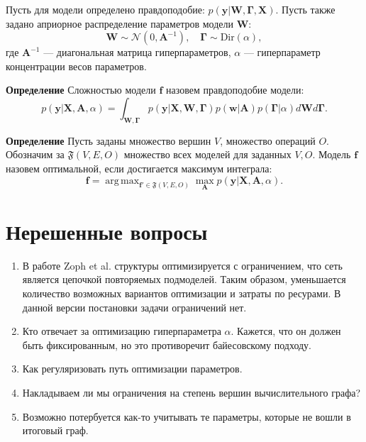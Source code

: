 \documentclass[12pt]{article}
\DeclareMathOperator*{\argmax}{arg\,max}
\begin{document}
Пусть для модели определено правдоподобие: $p(\mathbf{y}|\mathbf{W},\boldsymbol{\Gamma}, \mathbf{X})$. Пусть также задано априорное распределение параметров модели $\mathbf{W}$:
\[
    \mathbf{W} \sim \mathcal{N}(0, \mathbf{A}^{-1}), \quad \boldsymbol{\Gamma} \sim \text{Dir}(\alpha),
\]
где $\mathbf{A}^{-1}$ --- диагональная матрица гиперпараметров, $\alpha$ --- гиперпараметр концентрации весов параметров.

\textbf{Определение} Сложностью модели $\mathbf{f}$ назовем правдоподобие модели: 
\begin{equation}
\label{eq:evidence}
	p(\mathbf{y}|\mathbf{X},\mathbf{A},\alpha) = \int_{\mathbf{W}, \boldsymbol{\Gamma} } p(\mathbf{y}|\mathbf{X},\mathbf{W},  \boldsymbol{\Gamma})p(\mathbf{w}|\mathbf{A})p(\boldsymbol{\Gamma}|\alpha)d\mathbf{W}d\mathbf{\Gamma}.
\end{equation}


\textbf{Определение} Пусть заданы множество вершин $V$, множество операций $O$. Обозначим за $\mathfrak{F}(V,E,O)$ множество всех моделей для заданных $V,O$.
Модель $\mathbf{f}$ назовем оптимальной, если достигается максимум интеграла:
\[
    \mathbf{f} = \argmax_{\mathbf{f}' \in \mathfrak{F}(V,E,O)}\max_{\mathbf{A}} p(\mathbf{y}|\mathbf{X},\mathbf{A},\alpha).
\]

\newpage
\section{Нерешенные вопросы}
\begin{enumerate}
\item В работе Zoph et al. структуры оптимизируется с ограничением, что сеть является цепочкой повторяемых подмоделей. Таким образом, уменьшается количество возможных вариантов оптимизации и затраты по ресурами. В данной версии постановки задачи ограничений нет.
\item Кто отвечает за оптимизацию гиперпараметра $\alpha$. Кажется, что он должен быть фиксированным, но это противоречит байесовскому подходу.
\item Как регуляризовать путь оптимизации параметров.
\item Накладываем ли мы ограничения на степень вершин вычислительного графа?
\item Возможно потербуется как-то учитывать те параметры, которые не вошли в итоговый граф.
\end{enumerate}
\iffalse
\end{document}
